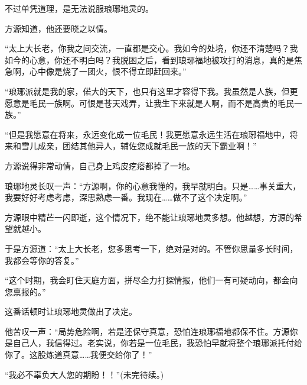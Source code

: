 \begin{this_body}
不过单凭道理，是无法说服琅琊地灵的。

方源知道，他还要晓之以情。

“太上大长老，你我之间交流，一直都是交心。我如今的处境，你还不清楚吗？我如今的心意，你还不明白吗？我脱困之后，看到琅琊福地被攻打的消息，真的是焦急啊，心中像是烧了一团火，恨不得立即赶回来。”

“琅琊派就是我的家，偌大的天下，也只有这里才容得下我。我虽然是人族，但更愿意是毛民一族啊。可恨是苍天戏弄，让我生下来就是人啊，而不是高贵的毛民一族。”

“但是我愿意在将来，永远变化成一位毛民！我更愿意永远生活在琅琊福地中，将来和雪儿成亲，团结其他异人，辅佐您成就毛民一族的天下霸业啊！”

方源说得非常动情，自己身上鸡皮疙瘩都掉了一地。

琅琊地灵长叹一声：“方源啊，你的心意我懂的，我早就明白。只是……事关重大，我要好好考虑考虑，深思熟虑一番。我现在……做不了这个决定啊。”

方源眼中精芒一闪即逝，这个情况下，绝不能让琅琊地灵多想。他越想，方源的希望就越小。

于是方源道：“太上大长老，您多思考一下，绝对是对的。不管你思量多长时间，我都会等你的答复。”

“这个时期，我会盯住天庭方面，拼尽全力打探情报，他们一有可疑动向，都会向您禀报的。”

这番话顿时让琅琊地灵做出了决定。

他苦叹一声：“局势危险啊，若是还保守真意，恐怕连琅琊福地都保不住。方源你是自己人，我信得过。老实说，你若是一位毛民，我恐怕早就将整个琅琊派托付给你了。这股炼道真意……我便交给你了！”

“我必不辜负大人您的期盼！！”(未完待续。)

\end{this_body}

